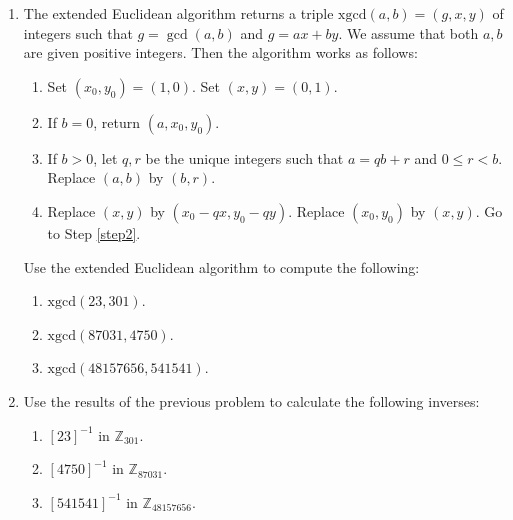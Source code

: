 \documentclass[11pt]{article}
\newenvironment{problems}
{
 \begin{enumerate}[topsep=1pt,itemsep=0pt,parsep=2pt,leftmargin=0.6cm,%
 label={\arabic*.}, ref=\arabic*] \small
}
{
 \end{enumerate}
}
\theoremstyle{definition}
\newcommand{\Z}{\mathbb{Z}} %
\begin{document}
\begin{problems}
\item The extended Euclidean algorithm returns a triple
  $\text{xgcd}(a,b) = (g,x,y)$ of integers such that $g = \gcd(a,b)$
  and $g = ax+by$. We assume that both $a,b$ are given positive
  integers. Then the algorithm works as follows:
  \begin{enumerate}[label=\arabic*),ref=\arabic*]\sf
  \item Set $(x_0, y_0) = (1,0)$. Set $(x,y) = (0,1)$. 
  \item\label{step2} If $b = 0$, return $(a,x_0, y_0)$.
  \item If $b>0$, let $q,r$ be the unique integers such that $a=qb+r$
    and $0 \le r < b$. Replace $(a,b)$ by $(b,r)$.
  \item Replace $(x,y)$ by $(x_0-qx, y_0-qy)$. Replace $(x_0,y_0)$ by
    $(x,y)$. Go to Step \ref{step2}. 
  \end{enumerate}
  Use the extended Euclidean algorithm to compute the following:
  \begin{multicols}{3}
  \begin{enumerate}[topsep=0pt,parsep=0pt]
  \item $\text{xgcd}(23,301)$.
  \item $\text{xgcd}(87031, 4750)$.
  \item $\text{xgcd}(48157656,541541)$.
  \end{enumerate}
  \end{multicols}


\item Use the results of the previous problem to calculate the
  following inverses:
  \begin{multicols}{2}
  \begin{enumerate}[topsep=0pt,parsep=0pt]
  \item $[23]^{-1}$ in $\Z_{301}$.
  \item $[4750]^{-1}$ in $\Z_{87031}$. 
  \item $[541541]^{-1}$ in $\Z_{48157656}$. 
  \end{enumerate}
  \end{multicols}


\end{problems}
\end{document}
